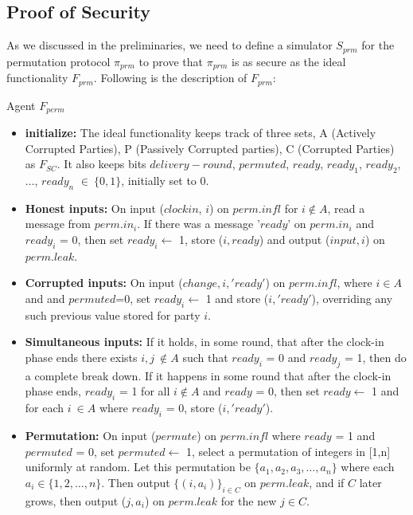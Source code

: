 \documentclass{llncs}
\begin{document}
\subsection{Proof of Security}
As we discussed in the preliminaries, we need to define a simulator $ S_{prm} $ for the permutation protocol $ \pi_{prm} $ to prove that $ \pi_{prm} $ is as secure as the ideal functionality $ F_{prm} $. Following is the description of $ F_{prm} $:\\
\begin{framed}
\begin{center}
Agent $F_{perm}$
\end{center}
\begin{itemize}
\item \textbf{initialize:} The ideal functionality keeps track of three sets, A (Actively Corrupted Parties), P (Passively Corrupted parties), C (Corrupted Parties) as $F_{SC}$. It also keeps bits $delivery-round$, $permuted$, $ready$, $ready_1$, $ready_2$,$\dots$, $ready_n$ $ \in\ \{0,1\}$, 
initially set to 0.

\item \textbf{Honest inputs:} On input ($clockin$, $i$) on $perm.infl$ for $i \notin A$, read a message from $perm.in_i$. If there was a message '$ready$' on $perm.in_i$ and $ready_i$ = 0, then set $ready_i\leftarrow$  1, store ($i, ready$) and output ($input, i$) on $perm.leak$.

\item \textbf{Corrupted inputs:} On input ($change, i, 'ready'$) on $perm.infl$, where $i \in A$ and and $permuted$=0, set $ready_i \leftarrow$ 1 and store ($i,'ready'$), overriding any such previous value stored for party $i$.

\item \textbf{Simultaneous inputs:}  If it holds, in some round, that after the clock-in phase ends there exists $i,j\ \notin A$ such that $ready_i$ = 0 and $ready_j$ = 1, then do a complete break down. If it happens in some round that after the clock-in phase ends, $ready_i$ = 1 for all $i \notin A$ and $ready$ = 0, then set $ready \leftarrow$ 1 and for each $i\ \in A$ where $ready_i$ = 0, store ($i,'ready'$).

\item \textbf{Permutation:} On input ($permute$) on $perm.infl$ where $ready$ = 1 and $permuted$ = 0, set $permuted \leftarrow$ 1, select a permutation of integers in [1,n] uniformly at random. Let this permutation be $\{a_1, a_2, a_3, \dots, a_n \}$ where each $a_i \in \{1,2,\dots ,n\}$.  Then output 
$\{(i,a_i)\}_{i \in C}$ on $perm.leak$, and if $C$ later grows, then output ($j,a_i$) on $perm.leak$ for the new $j \in C$.


\end{itemize}
\end{framed}
\end{document}
